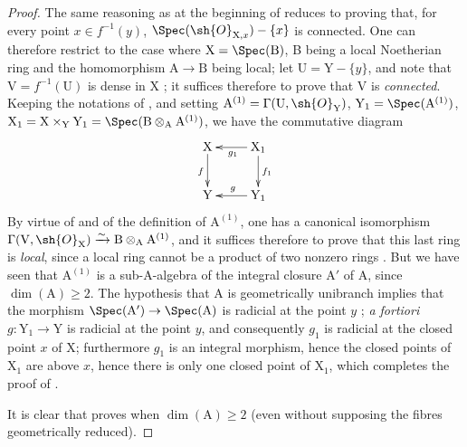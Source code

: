 \begin{proof}
The same reasoning as at the beginning of  reduces to proving that, for every point $x\in f^{-1}(y)$, $\Spec(\sh{O}_{\mathrm{X},x})-\{x\}$ is connected.
One can therefore restrict to the case where $\mathrm{X}=\Spec(\mathrm{B})$, B being a local Noetherian ring and the homomorphism $\mathrm{A}\to\mathrm{B}$ being local;
let $\mathrm{U}=\mathrm{Y}-\{y\}$, and note that $\mathrm{V}=f^{-1}(\mathrm{U})$ is dense in X ;
it suffices therefore to prove that V is \emph{connected}.
Keeping the notations of , and setting $\mathrm{A}^{(1)}=\Gamma(\mathrm{U},\sh{O}_{\mathrm{Y}})$, $\mathrm{Y}_1=\Spec(\mathrm{A}^{(1)})$, $\mathrm{X}_1=\mathrm{X}\times_{\mathrm{Y}}\mathrm{Y}_1=\Spec(\mathrm{B}\otimes_{\mathrm{A}}\mathrm{A}^{(1)})$, we have the commutative diagram
\[
  \xymatrix{
    \mathrm{X} \ar[d]_{f} & \mathrm{X}_1 \ar[l]^{g_1} \ar[d]^{f_1} \\
    \mathrm{Y} & \mathrm{Y}_1 \ar[l]_{g}
  }
\]
By virtue of  and of the definition of $\mathrm{A}^{(1)}$, one has a canonical isomorphism $\Gamma(\mathrm{V},\sh{O}_{\mathrm{X}})\xrightarrow{\sim}\mathrm{B}\otimes_{\mathrm{A}}\mathrm{A}^{(1)}$, and it suffices therefore to prove that this last ring is \emph{local}, since a local ring cannot be a product of two nonzero rings .
But we have seen  that $\mathrm{A}^{(1)}$ is a sub-A-algebra of the integral closure $\mathrm{A}'$ of A, since $\dim(\mathrm{A})\geq 2$.
The hypothesis that A is geometrically unibranch implies that the morphism $\Spec(\mathrm{A}')\to\Spec(\mathrm{A})$ is radicial at the point $y$ ;
\emph{a fortiori} $g:\mathrm{Y}_1\to\mathrm{Y}$ is radicial at the point $y$, and consequently $g_1$ is radicial at the closed point $x$ of X;
furthermore $g_1$ is an integral morphism, hence the closed points of $\mathrm{X}_1$ are above $x$, hence there is only one closed point of $\mathrm{X}_1$, which completes the proof of .

It is clear that  proves  when $\dim(\mathrm{A})\geq 2$ (even without supposing the fibres geometrically reduced).


\end{proof}
